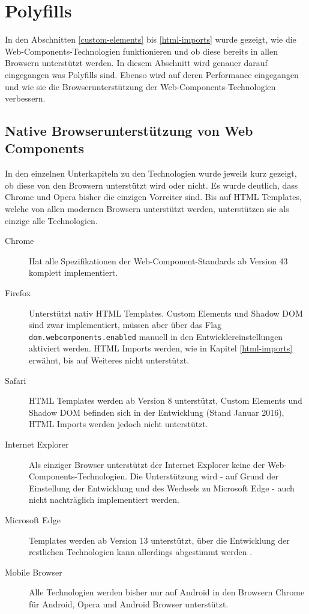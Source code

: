 \section{Polyfills}\label{polyfills-mit-webcomponents.js}

In den Abschnitten \ref{custom-elements} bis \ref{html-imports} wurde gezeigt, wie die Web-Components-Technologien funktionieren und ob diese bereits in allen Browsern unterstützt werden. In diesem Abschnitt wird genauer darauf eingegangen was Polyfills sind. Ebenso wird auf deren Performance eingegangen und wie sie die Browserunterstützung der Web-Components-Technologien verbessern.


\subsection{Native Browserunterstützung von Web Components}\label{native-browserunterstuxfctzung-von-web-components}

In den einzelnen Unterkapiteln zu den Technologien wurde jeweils kurz gezeigt, ob diese von den Browsern unterstützt wird oder nicht. Es wurde deutlich, dass Chrome und Opera bisher die einzigen Vorreiter sind. Bis auf \ac{HTML} Templates, welche von allen modernen Browsern unterstützt werden, unterstützen sie als einzige alle Technologien. \cite{citeulike:13914379}

\begin{description}
  \item[Chrome] Hat alle Spezifikationen der Web-Component-Standards ab Version 43 komplett implementiert.
  \item[Firefox] Unterstützt nativ \ac{HTML} Templates. Custom Elements und Shadow \ac{DOM} sind zwar implementiert, müssen aber über das Flag \texttt{dom.webcomponents.enabled} manuell in den Entwicklereinstellungen aktiviert werden. \ac{HTML} Imports werden, wie in Kapitel \ref{html-imports} erwähnt, bis auf Weiteres nicht unterstützt.
  \item[Safari] \ac{HTML} Templates werden ab Version 8 unterstützt, Custom Elements und Shadow \ac{DOM} befinden sich in der Entwicklung (Stand Januar 2016), \ac{HTML} Imports werden jedoch nicht unterstützt.
  \item[Internet Explorer] Als einziger Browser unterstützt der Internet Explorer keine der Web-Components-Technologien. Die Unterstützung wird - auf Grund der Einstellung der Entwicklung und des Wechsels zu Microsoft Edge - auch nicht nachträglich implementiert werden.
  \item[Microsoft Edge] Templates werden ab Version 13 unterstützt, über die Entwicklung der restlichen Technologien kann allerdings abgestimmt werden \cite{citeulike:13914237}.
  \item[Mobile Browser] Alle Technologien werden bisher nur auf Android in den Browsern Chrome für Android, Opera und Android Browser unterstützt.
\end{description}

